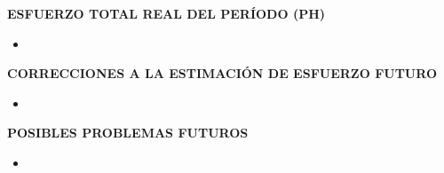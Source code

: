 \documentclass[10pt,letter]{article}
\begin{document}
\vspace{0,5cm}
{\bf ESFUERZO TOTAL REAL DEL PER\'IODO (PH)}
\begin{itemize}
\item
\end{itemize}

\vspace{0,5cm}
{\bf CORRECCIONES A LA ESTIMACI\'ON DE ESFUERZO FUTURO}
\begin{itemize}
\item 
\end{itemize}

\vspace{0,5cm}
{\bf POSIBLES PROBLEMAS FUTUROS}
\begin{itemize}
\item 
\end{itemize}
\end{document}
